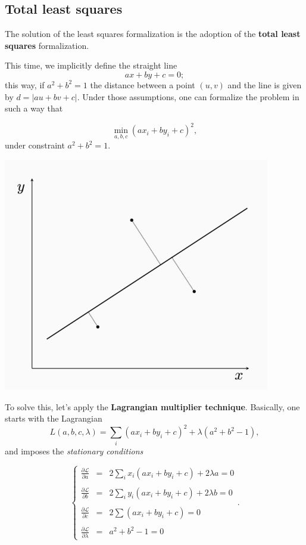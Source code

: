 \documentclass[10pt]{report}
\begin{document}
\subsection{Total least squares}
\label{sec:org04c039a}
The solution of the least squares formalization is the adoption of the
\textbf{total least squares} formalization.

This time, we implicitly define the straight line \[ax + by + c = 0;\]
this way, if \(a^2 + b^2 = 1\) the distance between a point \((u, v)\)
and the line is given by \(d = |au + bv + c|\). Under those assumptions,
one can formalize the problem in such a way that

\[\min_{a, b, c} (ax_i + by_i + c)^2,\] under constraint
\(a^2 + b^2 = 1.\)

\begin{center}
\includegraphics[scale=0.3]{./pics/fit/total-least-squares.jpg}
\end{center}

To solve this, let's apply the \textbf{Lagrangian multiplier technique}.
Basically, one starts with the Lagrangian
\[L(a, b, c, \lambda) = \sum_i (ax_i + by_i + c)^2 + \lambda(a^2 + b^2 - 1),\] and imposes the \emph{stationary conditions}

\[ \left\{ \begin{array}{lll} \frac{\partial \mathcal{L}}{\partial a} & = & 2\sum_i x_i(ax_i + by_i + c) + 2 \lambda a = 0 \\ \\ \frac{\partial \mathcal{L}}{\partial b} & = & 2\sum_i y_i(ax_i + by_i + c) + 2 \lambda b = 0 \\ \\ \frac{\partial \mathcal{L}}{\partial c} & = & 2\sum (ax_i + by_i + c) = 0 \\ \\ \frac{\partial \mathcal{L}}{\partial \lambda} & = & a^2 + b^2 - 1 = 0 \end{array} \right. . \]
\end{document}
